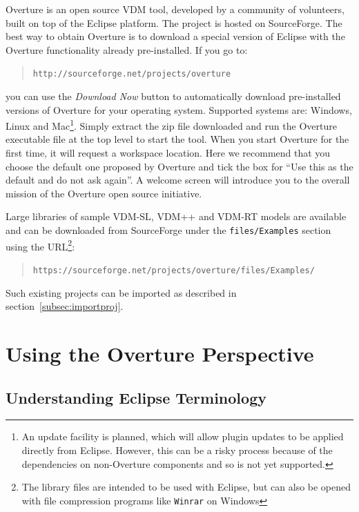 \documentclass{overturerepchap}
\newcommand{\url}[1]{\texttt{#1}}
\begin{document}
Overture is an open source VDM tool, developed by a community of volunteers,
built on top of the Eclipse platform. The project 
is hosted on SourceForge.  The best way to obtain Overture is to download 
a special version of Eclipse with the Overture functionality already pre-installed. If you go to:
  \begin{quote}
  \url{http://sourceforge.net/projects/overture}
  \end{quote}
  \noindent you can use the \textit{Download Now} button to
  automatically download pre-installed versions of Overture for your
  operating system.  Supported systems are: Windows, Linux and
  Mac\footnote{An update facility is planned, which will allow plugin
    updates to be applied directly from Eclipse.
    However, this can be
    a risky process because of the dependencies on non-Overture
    components and so is not yet supported.}.
Simply extract the zip file downloaded and run the Overture executable
file at the top level to start the tool.
When you start Overture for the first time, it will request a workspace
location. Here we recommend that you  choose the default one proposed 
by Overture and tick the box for ``Use this as the default and do
not ask again''. A welcome screen will introduce you to the overall 
mission of the Overture open source initiative. 

Large libraries of sample VDM-SL, VDM++ and VDM-RT models are available
and can be downloaded from SourceForge under the
\texttt{files/Examples} section using the URL\footnote{The library
  files are intended to be used with Eclipse, but can also be opened with
  file compression programs like \texttt{Winrar} on Windows}:
\begin{quote}
\url{https://sourceforge.net/projects/overture/files/Examples/}
\end{quote}
Such existing projects can be imported as described in
section~\ref{subsec:importproj}. 

\chapter{Using the Overture Perspective}\label{sec:vdmsupport}

\section{Understanding Eclipse Terminology}
\end{document}
